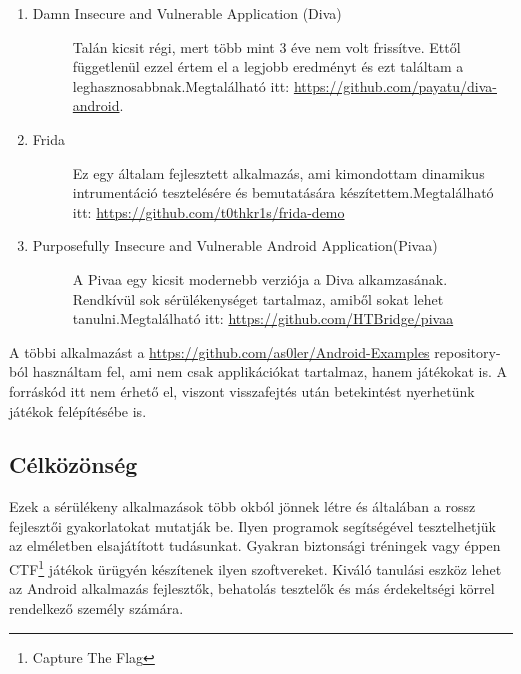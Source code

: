 \documentclass{thesis-ekf}
\theoremstyle{definition}
\theoremstyle{remark}
\begin{document}
\begin{enumerate}
	\item
	\begin{description}
		\item[Damn Insecure and Vulnerable Application (Diva)] Talán kicsit régi, mert több mint 3 éve nem volt frissítve. Ettől függetlenül ezzel értem el a legjobb eredményt és ezt találtam a leghasznosabbnak.\newline  Megtalálható itt: \url{https://github.com/payatu/diva-android}.
	\end{description}
	\item
	\begin{description}
		\item [Frida] Ez egy általam fejlesztett alkalmazás, ami kimondottam dinamikus intrumentáció tesztelésére és bemutatására készítettem.\newline Megtalálható itt: \url{https://github.com/t0thkr1s/frida-demo}
	\end{description}
	\item
	\begin{description}
		\item [Purposefully Insecure and Vulnerable Android Application(Pivaa)] A Pivaa egy kicsit modernebb verziója a Diva alkamzasának. Rendkívül sok sérülékenységet tartalmaz, amiből sokat lehet tanulni.\newline Megtalálható itt: \url{https://github.com/HTBridge/pivaa}
	\end{description}
\end{enumerate}

A többi alkalmazást a \url{https://github.com/as0ler/Android-Examples} repository-ból használtam fel, ami nem csak applikációkat tartalmaz, hanem játékokat is.
A forráskód itt nem érhető el, viszont visszafejtés után betekintést nyerhetünk játékok felépítésébe is.

\subsection{Célközönség}

Ezek a sérülékeny alkalmazások több okból jönnek létre és általában a rossz fejlesztői gyakorlatokat mutatják be.
Ilyen programok segítségével tesztelhetjük az elméletben elsajátított tudásunkat.
Gyakran biztonsági tréningek vagy éppen CTF\footnote{Capture The Flag} játékok ürügyén készítenek ilyen szoftvereket.
Kiváló tanulási eszköz lehet az Android alkalmazás fejlesztők, behatolás tesztelők és más érdekeltségi körrel rendelkező személy számára.
\end{document}
